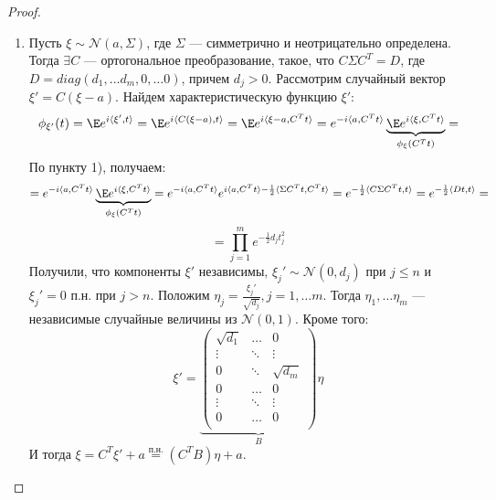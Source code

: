 \begin{proof}\indent
    \begin{enumerate}
        \item[\((1) \Ra (2)\)] Пусть \(\xi \sim \mathcal{N}(a, \Sigma)\), где \(\Sigma\) --- симметрично и неотрицательно определена. Тогда \(\exists C\) --- ортогональное преобразование, такое, что \(C\Sigma C^T = D\), где \(D = diag(d_1, \dots d_m, 0, \dots 0)\), причем \(d_j > 0\). Рассмотрим случайный вектор \(\xi' = C(\xi - a)\). Найдем характеристическую функцию \(\xi'\):
        \[\phi_{\xi'}(t) = \E e^{i \langle \xi', t \rangle} = \E e^{i \langle C(\xi - a), t \rangle} = \E e^{i \langle \xi - a, C^Tt \rangle} = e^{-i\langle a, C^Tt \rangle} \underbrace{\E e^{i \langle \xi, C^Tt \rangle}}_{\phi_\xi(C^Tt)} = \]
        По пункту 1), получаем:
        \[= e^{-i\langle a, C^Tt \rangle} \underbrace{\E e^{i \langle \xi, C^Tt \rangle}}_{\phi_\xi(C^Tt)} = e^{-i\langle a, C^Tt \rangle} e^{i \langle a, C^Tt \rangle - \frac{1}{2}\langle \Sigma C^Tt, C^Tt \rangle} = e^{-\frac{1}{2}\langle C\Sigma C^Tt, t \rangle} = e^{-\frac{1}{2}\langle Dt, t \rangle} = \]
        \[= \prod_{j = 1}^m e^{-\frac{1}{2}d_jt_j^2}\]
        Получили, что компоненты \(\xi'\) независимы, \(\xi_j' \sim \mathcal{N}(0, d_j)\) при \(j \le n\) и \(\xi_j' = 0\) п.н. при \(j > n\). Положим \(\eta_j = \frac{\xi_j'}{\sqrt{d_j}}, j = 1, \dots m\). Тогда \(\eta_1, \dots \eta_m\) --- независимые случайные величины из \(\mathcal{N}(0, 1)\). Кроме того:
        \[\xi' = \underbrace{\left( \begin{array}{ccc}
            \sqrt{d_1} & \dots & 0 \\
            \vdots & \ddots & \vdots \\
            0 & \ddots & \sqrt{d_m} \\
            0 & \dots & 0 \\
            \vdots & \ddots & \vdots \\
            0 & \dots & 0 \\
        \end{array} \right)}_B\eta\]
        И тогда \(\xi = C^T\xi' + a \stackrel{\text{п.н.}}{=} (C^TB)\eta + a\).


\end{enumerate}
\end{proof}
